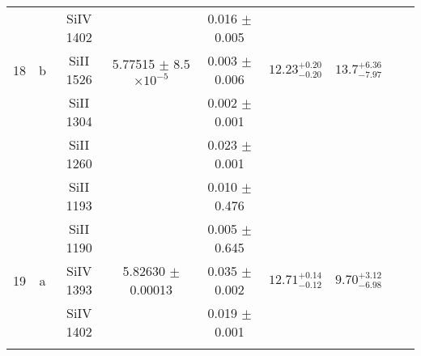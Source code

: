 \documentclass[12pt]{article}
\begin{document}
\begin{footnotesize}
\begin{longtable}{ c c c c c c c c c}
  &   & SiIV     1402  &  &  0.016 $\pm$ 0.005   &   &     & 	 & \\ 
      18  & b  & SiII     1526  &  5.77515 $\pm$ 8.5 $\times 10^{-5}$   &  0.003 $\pm$ 0.006   & $12.23_{ - 0.20}^{ + 0.20}$  & $13.7_{ - 7.97}^{ + 6.36}$    & 	 & \\ 
  &   & SiII     1304  &  &  0.002 $\pm$ 0.001   &   &     & 	 & \\ 
  &   & SiII     1260  &  &  0.023 $\pm$ 0.001   &   &     & 	 & \\ 
  &   & SiII     1193  &  &  0.010 $\pm$ 0.476   &   &     & 	 & \\ 
  &   & SiII     1190  &  &  0.005 $\pm$ 0.645   &   &     & 	 & \\ 
      19  & a  & SiIV     1393  &  5.82630 $\pm$ 0.00013  &  0.035 $\pm$ 0.002   & $12.71_{ - 0.12}^{ + 0.14}$  & $9.70_{ - 6.98}^{ + 3.12}$    & 	 & \\ 
  &   & SiIV     1402  &  &  0.019 $\pm$ 0.001   &   &     & 	 & \\ 
 &        &                   &                &   & 					&							&   	 	& \\  
\hline                                                                                                           
\hline                                                                                                           
\end{longtable}                                                                                                  
\end{footnotesize}                                                                                                  
\end{document}
